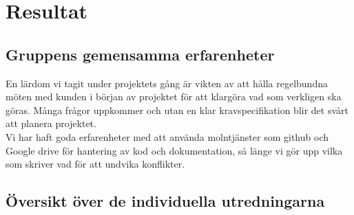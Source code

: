 \section{Resultat}

\subsection{Gruppens gemensamma erfarenheter}
En lärdom vi tagit under projektets gång är vikten av att hålla regelbundna möten med kunden i början av projektet för att klargöra vad som verkligen ska göras. Många frågor uppkommer och utan en klar kravspecifikation blir det svårt att planera projektet.
\\
Vi har haft goda erfarenheter med att använda molntjänster som github och Google drive för hantering av kod och dokumentation, så länge vi gör upp vilka som skriver vad för att undvika konflikter.     


\subsection{Översikt över de individuella utredningarna}